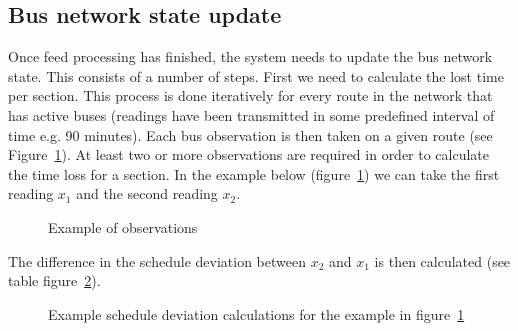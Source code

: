 \subsection{Bus network state update}
Once feed processing has finished, the system needs to update the bus network state. This consists of a number of steps. First we need to calculate the lost time per section. This process is done iteratively for every route in the network that has active buses (readings have been transmitted in some predefined interval of time e.g. 90 minutes). Each bus observation is then taken on a given route (see Figure~\ref{fig:example1}). At least two or more observations are required in order to calculate the time loss for a section. In the example below (figure~\ref{fig:example1}) we can take the first reading $x_1$ and the second reading $x_2$.
\begin{figure}[ht]
	\caption{Example of observations}
	\label{fig:example1}
\end{figure}
The difference in the schedule deviation between $x_2$ and $x_1$ is then calculated (see table figure~\ref{fig:example1Table}). 
\begin{figure}[ht]
	\caption{Example schedule deviation calculations for the example in figure~\ref{fig:example1}}
	\label{fig:example1Table}
\end{figure}

